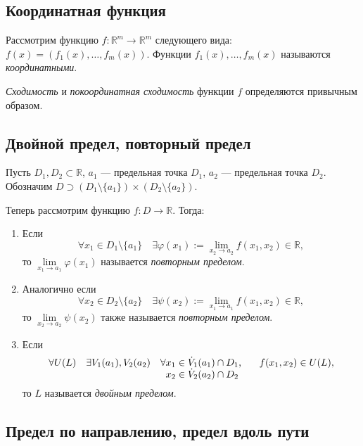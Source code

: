 \subsection{Координатная функция}

\begin{definition}
	Рассмотрим функцию \(f \colon \mathbb{R}^m \to \mathbb{R}^m\) следующего вида: \(f(x) = (f_1 (x), \ldots, f_m (x))\). Функции \(f_1 (x), \ldots, f_m (x)\) называются \textit{координатными}.
\end{definition}

\begin{remark}
	\textit{Сходимость} и \textit{покоординатная сходимость} функции \(f\) определяются привычным образом.
\end{remark}

\subsection{Двойной предел, повторный предел}

\begin{definition}
	Пусть \(D_1, D_2 \subset \mathbb{R}\), \(a_1\) --- предельная точка \(D_1\), \(a_2\) --- предельная точка \(D_2\). Обозначим \(D \supset (D_1 \setminus \{a_1\}) \times (D_2 \setminus \{a_2\})\).
	
	Теперь рассмотрим функцию \(f \colon D \to \mathbb{R}\). Тогда:
	\begin{enumerate}
		\item Если \[
			\forall x_1 \in D_1 \setminus \{a_1\} \quad \exists \varphi(x_1) := \lim_{x_2 \to a_2} f (x_1, x_2) \in \mathbb{R},
		\]
		то \(\lim\limits_{x_1 \to a_1} \varphi(x_1)\) называется \textit{повторным пределом}.
		\item Аналогично если \[
		\forall x_2 \in D_2 \setminus \{a_2\} \quad \exists \psi(x_2) := \lim_{x_1 \to a_1} f (x_1, x_2) \in \mathbb{R},
		\]
		то \(\lim\limits_{x_2 \to a_2} \psi(x_2)\) также называется \textit{повторным пределом}.
		\item Если \[
			\forall U(L) \quad \exists V_1 (a_1), V_2 (a_2) \quad \forall \parbox[t]{3cm}{\(x_1 \in \dot V_1 (a_1) \cap D_1\), \\ \(x_2 \in \dot V_2 (a_2) \cap D_2\)} \quad f(x_1, x_2) \in U(L),
		\]
		то \(L\) называется \textit{двойным пределом}.
	\end{enumerate}
\end{definition}

\subsection{Предел по направлению, предел вдоль пути}

